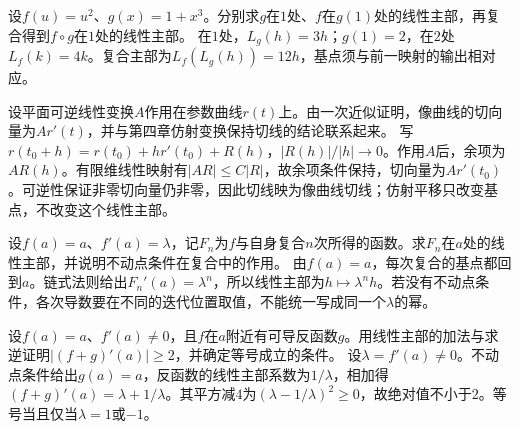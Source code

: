 设\(f(u)=u^2\)、\(g(x)=1+x^3\)。分别求\(g\)在\(1\)处、\(f\)在\(g(1)\)处的线性主部，再复合得到\(f\circ g\)在\(1\)处的线性主部。
\solutionanswer
在\(1\)处，\(L_g(h)=3h\)；\(g(1)=2\)，在\(2\)处\(L_f(k)=4k\)。复合主部为\(L_f(L_g(h))=12h\)，基点须与前一映射的输出相对应。


设平面可逆线性变换\(A\)作用在参数曲线\(r(t)\)上。由一次近似证明，像曲线的切向量为\(Ar'(t)\)，并与第四章仿射变换保持切线的结论联系起来。
\solutionanswer
写\(r(t_0+h)=r(t_0)+hr'(t_0)+R(h)\)，\(|R(h)|/|h|\to0\)。作用\(A\)后，余项为\(AR(h)\)。有限维线性映射有\(|AR|\le C|R|\)，故余项条件保持，切向量为\(Ar'(t_0)\)。可逆性保证非零切向量仍非零，因此切线映为像曲线切线；仿射平移只改变基点，不改变这个线性主部。


设\(f(a)=a\)、\(f'(a)=\lambda\)，记\(F_n\)为\(f\)与自身复合\(n\)次所得的函数。求\(F_n\)在\(a\)处的线性主部，并说明不动点条件在复合中的作用。
\solutionanswer
由\(f(a)=a\)，每次复合的基点都回到\(a\)。链式法则给出\(F_n'(a)=\lambda^n\)，所以线性主部为\(h\mapsto\lambda^nh\)。若没有不动点条件，各次导数要在不同的迭代位置取值，不能统一写成同一个\(\lambda\)的幂。


设\(f(a)=a\)、\(f'(a)\ne0\)，且\(f\)在\(a\)附近有可导反函数\(g\)。用线性主部的加法与求逆证明\(|(f+g)'(a)|\ge2\)，并确定等号成立的条件。
\solutionanswer
设\(\lambda=f'(a)\ne0\)。不动点条件给出\(g(a)=a\)，反函数的线性主部系数为\(1/\lambda\)，相加得\((f+g)'(a)=\lambda+1/\lambda\)。其平方减\(4\)为\((\lambda-1/\lambda)^2\ge0\)，故绝对值不小于\(2\)。等号当且仅当\(\lambda=1\)或\(-1\)。
\par
